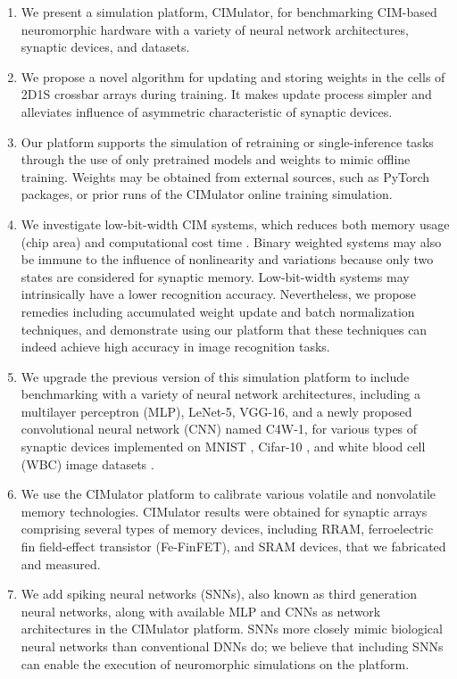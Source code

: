 \documentclass[journal]{IEEEtran}
\begin{document}
\begin{enumerate}[] 
\item 
We present a simulation platform, CIMulator, for benchmarking CIM-based neuromorphic hardware with a variety of neural network architectures, synaptic devices, and datasets.
\item
We propose a novel algorithm for updating and storing weights in the
cells of 2D1S \cite{2D1S} crossbar arrays during training. It makes update process simpler and alleviates influence of asymmetric characteristic of synaptic devices.
\item
Our platform supports the simulation of retraining or single-inference
tasks through the use of only pretrained models and weights to mimic offline
training. Weights may be obtained from external sources, such as PyTorch
packages, or prior runs of the CIMulator online training simulation.
\item
We investigate low-bit-width CIM systems, which reduces both memory usage (chip area) and computational cost time \cite{SWALP}. Binary weighted systems may also be immune to the influence of nonlinearity and variations because only two states are considered for synaptic memory. Low-bit-width systems may intrinsically have a lower recognition accuracy. Nevertheless, we propose remedies including accumulated weight update \cite{accumulated} and batch normalization \cite{Batchnorm} techniques, and demonstrate using our platform that these techniques can indeed achieve high accuracy in image recognition tasks.
\item
We upgrade the previous version of this simulation platform \cite{CIMulator_v1, ICASI_Lu, Thesis_WeiChen} to include benchmarking with a variety of neural network architectures, including a multilayer perceptron (MLP), LeNet-5, VGG-16, and a newly proposed convolutional neural network (CNN) named C4W-1, for various types of synaptic devices implemented on MNIST \cite{MNIST}, Cifar-10 \cite{Cifar10}, and white blood cell (WBC) image datasets \cite{WBC}.
\item
We use the CIMulator platform to calibrate various volatile and nonvolatile
memory technologies. CIMulator results were obtained for synaptic
arrays comprising several types of memory devices, including RRAM, ferroelectric
fin field-effect transistor (Fe-FinFET), and SRAM devices, that we
fabricated and measured.
\item
We add spiking neural networks (SNNs), also known as third generation neural networks, along with available MLP and CNNs as network architectures in the CIMulator platform. SNNs more closely mimic biological neural networks than conventional DNNs do; we believe that including SNNs can enable the execution of neuromorphic simulations on the platform.

\end{enumerate}
\end{document}
